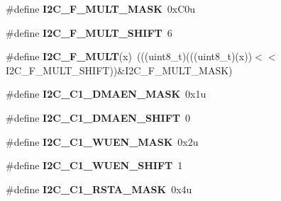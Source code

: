 \begin{DoxyCompactItemize}
\item 
\#define {\bfseries I2\+C\+\_\+\+F\+\_\+\+M\+U\+L\+T\+\_\+\+M\+A\+SK}~0x\+C0u\hypertarget{group__I2C__Register__Masks_ga9e077caa9ac07c03f5e34e431d0806fa}{}\label{group__I2C__Register__Masks_ga9e077caa9ac07c03f5e34e431d0806fa}

\item 
\#define {\bfseries I2\+C\+\_\+\+F\+\_\+\+M\+U\+L\+T\+\_\+\+S\+H\+I\+FT}~6\hypertarget{group__I2C__Register__Masks_ga3a338cb3af4c140fde82427d091d5b4a}{}\label{group__I2C__Register__Masks_ga3a338cb3af4c140fde82427d091d5b4a}

\item 
\#define {\bfseries I2\+C\+\_\+\+F\+\_\+\+M\+U\+LT}(x)~(((uint8\+\_\+t)(((uint8\+\_\+t)(x))$<$$<$I2\+C\+\_\+\+F\+\_\+\+M\+U\+L\+T\+\_\+\+S\+H\+I\+FT))\&I2\+C\+\_\+\+F\+\_\+\+M\+U\+L\+T\+\_\+\+M\+A\+SK)\hypertarget{group__I2C__Register__Masks_ga8f7d596736ebbdc72c823abdc045adfd}{}\label{group__I2C__Register__Masks_ga8f7d596736ebbdc72c823abdc045adfd}

\item 
\#define {\bfseries I2\+C\+\_\+\+C1\+\_\+\+D\+M\+A\+E\+N\+\_\+\+M\+A\+SK}~0x1u\hypertarget{group__I2C__Register__Masks_gadfd8fccdd35a4944a1e53ffa26e5d06b}{}\label{group__I2C__Register__Masks_gadfd8fccdd35a4944a1e53ffa26e5d06b}

\item 
\#define {\bfseries I2\+C\+\_\+\+C1\+\_\+\+D\+M\+A\+E\+N\+\_\+\+S\+H\+I\+FT}~0\hypertarget{group__I2C__Register__Masks_ga1cd5f87cc18a56d293697f0463e2a9e3}{}\label{group__I2C__Register__Masks_ga1cd5f87cc18a56d293697f0463e2a9e3}

\item 
\#define {\bfseries I2\+C\+\_\+\+C1\+\_\+\+W\+U\+E\+N\+\_\+\+M\+A\+SK}~0x2u\hypertarget{group__I2C__Register__Masks_ga708d3eded28946d6f2e4b7ed5aff8fe8}{}\label{group__I2C__Register__Masks_ga708d3eded28946d6f2e4b7ed5aff8fe8}

\item 
\#define {\bfseries I2\+C\+\_\+\+C1\+\_\+\+W\+U\+E\+N\+\_\+\+S\+H\+I\+FT}~1\hypertarget{group__I2C__Register__Masks_gad1bec740751b47fd0f4e02d913c3b287}{}\label{group__I2C__Register__Masks_gad1bec740751b47fd0f4e02d913c3b287}

\item 
\#define {\bfseries I2\+C\+\_\+\+C1\+\_\+\+R\+S\+T\+A\+\_\+\+M\+A\+SK}~0x4u\hypertarget{group__I2C__Register__Masks_ga656f6747e8edc8299767365ea1ac9d70}{}\label{group__I2C__Register__Masks_ga656f6747e8edc8299767365ea1ac9d70}


\end{DoxyCompactItemize}
